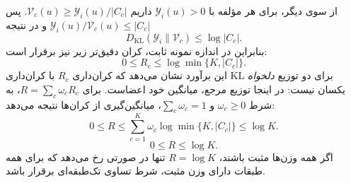 از سوی دیگر، برای هر مؤلفه با
$\mathscr Y_i(u)>0$ داریم
$\mathcal V_c(u)\ge
\mathscr Y_i(u)/|C_c|$.
پس $\mathscr Y_i(u)/\mathcal V_c(u)
\le |C_c|$ و در نتیجه
\[
D_{\mathrm{KL}}(\mathscr Y_i\|\mathcal V_c)
\le\log|C_c|.
\]
بنابراین در اندازه نمونه ثابت، کران
دقیق‌تر زیر نیز برقرار است:
\begin{equation}\label{eq:app-ch3-R-sample-bound}
\boxed{
0\le R_c\le\log\min\{K,|C_c|\}.
}
\end{equation}
این برآورد نشان می‌دهد که
کران‌داری $R_c$ با کران‌داری
KL برای دو توزیع \emph{دلخواه} یکسان نیست:
در اینجا توزیع مرجع، میانگین خود اعضاست.
برای $R=\sum_c\omega_cR_c$، به شرط
$\omega_c\ge0$ و $\sum_c\omega_c=1$،
میانگین‌گیری از کران‌ها نتیجه می‌دهد:
\[
0\le R\le
\sum_{c=1}^{K}\omega_c\log\min\{K,|C_c|\}
\le\log K.
\]
\begin{equation}\label{cmp:eq:ch3-R-weighted-bounds}
\boxed{0\le R\le\log K.}
\end{equation}
اگر همه وزن‌ها مثبت باشند،
$R=\log K$ تنها در صورتی رخ می‌دهد
که برای همه طبقات دارای وزن مثبت،
شرط تساوی تک‌طبقه‌ای برقرار باشد.

